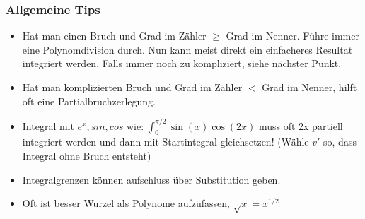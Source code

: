 \subsubsection{Allgemeine Tips}
\begin{itemize}[leftmargin=*]
	\item Hat man einen Bruch und Grad im Zähler $\geq$ Grad im Nenner. Führe immer eine Polynomdivision durch. Nun kann meist direkt ein einfacheres Resultat integriert werden. Falls immer noch zu kompliziert, siehe nächster Punkt.

	\item Hat man komplizierten Bruch und Grad im Zähler $<$ Grad im Nenner, hilft oft eine Partialbruchzerlegung.

	\item Integral mit $e^x,sin,cos$ wie: $\int_0^{\pi/2} \sin(x) \cos(2x)$ muss oft 2x partiell integriert werden und dann mit Startintegral gleichsetzen! (Wähle $v'$ so, dass Integral ohne Bruch entsteht)

	\item Integralgrenzen können aufschluss über Substitution geben.

	\item Oft ist besser Wurzel als Polynome aufzufassen, $\sqrt{x} = x^{1/2}$
\end{itemize}



